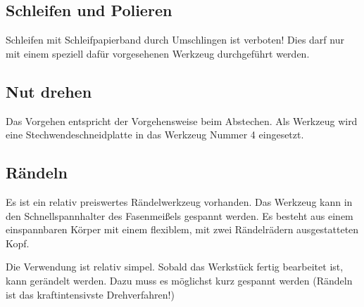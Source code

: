 \documentclass{\basedir/fablab-document}
\begin{document}
\subsection{Schleifen und Polieren}
Schleifen mit Schleifpapierband durch Umschlingen ist verboten! Dies darf nur mit einem speziell dafür vorgesehenen Werkzeug durchgeführt werden.

\subsection{Nut drehen}

Das Vorgehen entspricht der Vorgehensweise beim Abstechen. Als Werkzeug wird eine Stechwendeschneidplatte in das Werkzeug Nummer 4 eingesetzt. 


\subsection{Rändeln}
\label{handdrehen:raendeln}
Es ist ein relativ preiswertes Rändelwerkzeug vorhanden.
Das Werkzeug kann in den Schnellspannhalter des Fasenmeißels gespannt werden.
Es besteht aus einem einspannbaren Körper mit einem flexiblem, mit zwei Rändelrädern ausgestatteten Kopf.

Die Verwendung ist relativ simpel.
Sobald das Werkstück fertig bearbeitet ist, kann gerändelt werden.
Dazu muss es möglichst kurz gespannt werden (Rändeln ist das kraftintensivste Drehverfahren!)
\end{document}
